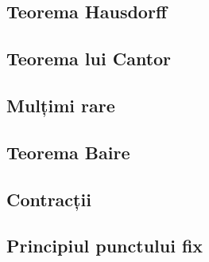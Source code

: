 \documentclass[a4paper,12pt]{article}
\theoremstyle{change}
\begin{document}
\subsection{Teorema Hausdorff}


\subsection{Teorema lui Cantor}

\subsection{Mulțimi rare}

\subsection{Teorema Baire}


\subsection{Contracții}

\subsection{Principiul punctului fix}
\end{document}
